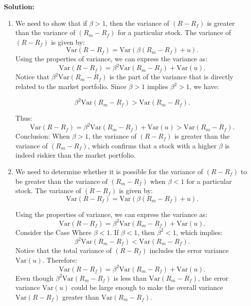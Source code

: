 \documentclass[12pt]{article}
\begin{document}
\begin{enumerate}
{\color{blue}
\noindent \textbf{Solution:}

\begin{enumerate}
    \item We need to show that if \( \beta > 1 \), then the variance of \( (R - R_f) \) is greater than the variance of \( (R_m - R_f) \) for a particular stock.    The variance of \( (R - R_f) \) is given by:
\[
\mathrm{Var}(R - R_f) = \mathrm{Var}(\beta (R_m - R_f) + u).
\]
Using the properties of variance, we can express the variance as:
\[
\mathrm{Var}(R - R_f) = \beta^2 \mathrm{Var}(R_m - R_f) + \mathrm{Var}(u).
\]
Notice that \( \beta^2 \mathrm{Var}(R_m - R_f) \) is the part of the variance that is directly related to the market portfolio. Since \( \beta > 1 \) implies \( \beta^2 > 1 \), we have:

\[
\beta^2 \mathrm{Var}(R_m - R_f) > \mathrm{Var}(R_m - R_f).
\]

Thus:
\[
\mathrm{Var}(R - R_f) = \beta^2 \mathrm{Var}(R_m - R_f) + \mathrm{Var}(u) > \mathrm{Var}(R_m - R_f).
\]
Conclusion: When \( \beta > 1 \), the variance of \( (R - R_f) \) is greater than the variance of \( (R_m - R_f) \), which confirms that a stock with a higher \( \beta \) is indeed riskier than the market portfolio.

\item We need to determine whether it is possible for the variance of \( (R - R_f) \) to be greater than the variance of \( (R_m - R_f) \) when \( \beta < 1 \) for a particular stock. The variance of \( (R - R_f) \) is given by:
\[
\mathrm{Var}(R - R_f) = \mathrm{Var}(\beta (R_m - R_f) + u).
\]

Using the properties of variance, we can express the variance as:
\[
\mathrm{Var}(R - R_f) = \beta^2 \mathrm{Var}(R_m - R_f) + \mathrm{Var}(u).
\]
Consider the Case Where \( \beta < 1 \). If \( \beta < 1 \), then \( \beta^2 < 1 \), which implies:
\[
\beta^2 \mathrm{Var}(R_m - R_f) < \mathrm{Var}(R_m - R_f).
\]
Notice that the total variance of \( (R - R_f) \) includes the error variance \( \mathrm{Var}(u) \). Therefore:
\[
\mathrm{Var}(R - R_f) = \beta^2 \mathrm{Var}(R_m - R_f) + \mathrm{Var}(u).
\]
Even though \( \beta^2 \mathrm{Var}(R_m - R_f) \) is less than \( \mathrm{Var}(R_m - R_f) \), the error variance \( \mathrm{Var}(u) \) could be large enough to make the overall variance \( \mathrm{Var}(R - R_f) \) greater than \( \mathrm{Var}(R_m - R_f) \).


\end{enumerate}}
\end{enumerate}
\end{document}
